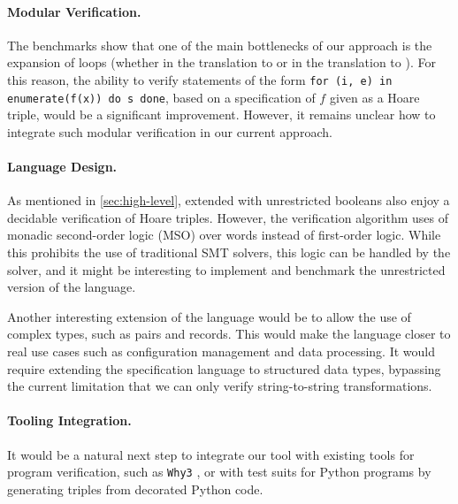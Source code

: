 \paragraph{Modular Verification.} The benchmarks show that one of the main
bottlenecks of our approach is the expansion of loops (whether in the
translation to  or in the translation to
). For this reason, the ability to verify
statements of the form \texttt{for (i, e) in enumerate(f(x)) do s done}, based
on a specification of $f$ given as a Hoare triple, would be a significant
improvement. However, it remains unclear how to integrate such modular
verification in our current approach.

\paragraph{Language Design.} As mentioned in \cref{sec:high-level},
 extended with unrestricted booleans also enjoy a decidable
verification of Hoare triples. However, the verification algorithm uses of
monadic second-order logic (MSO) over words instead of first-order logic. While
this prohibits the use of traditional SMT solvers, this logic can be handled by
the  solver, and it might be interesting to implement and benchmark
the unrestricted version of the language. 

Another interesting extension of the language would be to allow the use of
complex types, such as pairs and records. This would make the language closer
to real use cases such as configuration management and data processing. It
would require extending the specification language to structured data types,
bypassing the current limitation that we can only verify string-to-string
transformations.


\paragraph{Tooling Integration.} It would be a natural next step to integrate
our tool with existing tools for program verification, such as \texttt{Why3}
\cite{Why3}, or with test suits for Python programs by generating triples from
decorated Python code.
